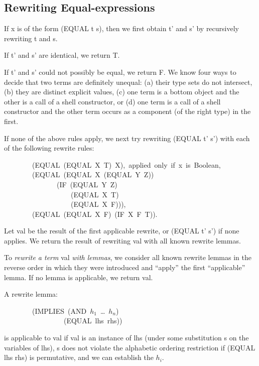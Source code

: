 \documentclass[10pt]{book}
\newenvironment{pubasis}{\begin{flushleft}}{\end{flushleft}}
\begin{document}
\subsection{Rewriting Equal-expressions}
If x is of the form (EQUAL t s), then we first obtain t' and s' by recursively
rewriting t and s.

If t' and s' are identical,
we return T.

If t' and s' could not possibly be equal, we return F.
We know four ways to decide that two terms are definitely unequal:
(a) their type sets do not intersect, (b) they are distinct
explicit values, (c) one term is a bottom object and the other is
a call of a shell constructor, or (d) one term is a call of a shell constructor and
the other term occurs as a component (of the right type) in the first.

If none of the above rules apply, we next try rewriting
(EQUAL t' s') with each of the following rewrite rules:

\begin{pubasis}
~~~~~~~~(EQUAL~(EQUAL~X~T)~X),~applied~only~if~x~is~Boolean,\\

~~~~~~~~(EQUAL~(EQUAL~X~(EQUAL~Y~Z))\\
~~~~~~~~~~~~~~~(IF~(EQUAL~Y~Z)\\
~~~~~~~~~~~~~~~~~~~(EQUAL~X~T)\\
~~~~~~~~~~~~~~~~~~~(EQUAL~X~F))),\\

~~~~~~~~(EQUAL~(EQUAL~X~F)~(IF~X~F~T)).\\
\end{pubasis}
Let val be the result of the first
applicable rewrite, or (EQUAL t' s') if none applies.
We return the result of rewriting val with all known
rewrite lemmas.

To \emph{rewrite a term} val \emph{with lemmas}, we consider all
known rewrite lemmas in the reverse order in which
they were introduced and ``apply'' the first ``applicable''
lemma.  If no lemma is applicable, we return val.

A rewrite lemma:
\begin{pubasis}
~~~~~~~~(IMPLIES~(AND~$h_{1}$~\ldots{}~$h_{n}$)\\
~~~~~~~~~~~~~~~~~(EQUAL~lhs~rhs))\\
\end{pubasis}
is applicable to val if val is an instance of lhs (under
some substitution s on the variables of lhs), s does not violate the alphabetic
ordering restriction if (EQUAL lhs rhs) is permutative,
and we can establish the $h_{i}$.
\end{document}
